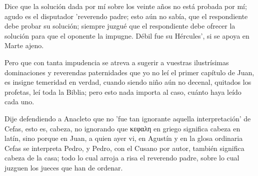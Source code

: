 Dice que la solución dada por mí sobre los veinte años no está probada por mí; agudo es el disputador 'reverendo padre; esto aún no sabía, que el respondiente debe probar su solución; siempre juzgué que el respondiente debe ofrecer la solución para que el oponente la impugne. Débil fue su Hércules', si se apoya en Marte ajeno.

Pero que con tanta impudencia se atreva a sugerir a vuestras ilustrísimas dominaciones y reverendas paternidades que yo no leí el primer capítulo de Juan, es insigne temeridad en verdad, cuando siendo niño aún no decenal, quitados los profetas, leí toda la Biblia; pero esto nada importa al caso, cuánto haya leído cada uno.

Dije defendiendo a Anacleto que no 'fue tan ignorante aquella interpretación' de Cefas, esto es, cabeza, no ignorando que κεφαλη en griego significa cabeza en latín, sino porque en Juan, a quien ayer vi, en Agustín y en la glosa ordinaria Cefas se interpreta Pedro, y Pedro, con el Cusano por autor, también significa cabeza de la casa; todo lo cual arroja a risa el reverendo padre, sobre lo cual juzguen los jueces que han de ordenar.

